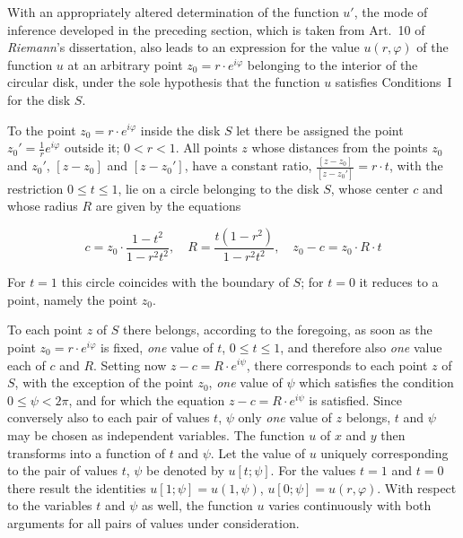 \documentclass{article}
\begin{document}
With an appropriately altered determination of the function $u'$, the mode of inference developed in the preceding section, which is taken from Art.~10 of \emph{Riemann}'s dissertation, also leads to an expression for the value $u(r, \varphi)$ of the function $u$ at an arbitrary point $z_0 = r \cdot e^{i\varphi}$ belonging to the interior of the circular disk, under the sole hypothesis that the function $u$ satisfies Conditions~I for the disk $S$.



To the point $z_0 = r \cdot e^{i\varphi}$ inside the disk $S$ let there be assigned the point $z_0' = \frac{1}{r} e^{i\varphi}$ outside it; $0 < r < 1$. All points $z$ whose distances from the points $z_0$ and $z_0'$, $[z - z_0]$ and $[z - z_0']$, have a constant ratio, $\frac{[z - z_0]}{[z - z_0']} = r \cdot t$, with the restriction $0 \le t \le 1$, lie on a circle belonging to the disk $S$, whose center $c$ and whose radius $R$ are given by the equations

\[

c = z_0 \cdot \frac{1 - t^2}{1 - r^2 t^2}, \quad R = \frac{t(1 - r^2)}{1 - r^2 t^2}, \quad z_0 - c = z_0 \cdot R \cdot t

\]

For $t = 1$ this circle coincides with the boundary of $S$; for $t = 0$ it reduces to a point, namely the point $z_0$.




To each point $z$ of $S$ there belongs, according to the foregoing, as soon as the point $z_0 = r \cdot e^{i\varphi}$ is fixed, \emph{one} value of $t$, $0 \le t \le 1$, and therefore also \emph{one} value each of $c$ and $R$. Setting now $z - c = R \cdot e^{i\psi}$, there corresponds to each point $z$ of $S$, with the exception of the point $z_0$, \emph{one} value of $\psi$ which satisfies the condition $0 \le \psi < 2\pi$, and for which the equation $z - c = R \cdot e^{i\psi}$ is satisfied. Since conversely also to each pair of values $t$, $\psi$ only \emph{one} value of $z$ belongs, $t$ and $\psi$ may be chosen as independent variables. The function $u$ of $x$ and $y$ then transforms into a function of $t$ and $\psi$. Let the value of $u$ uniquely corresponding to the pair of values $t$, $\psi$ be denoted by $u[t; \psi]$. For the values $t = 1$ and $t = 0$ there result the identities $u[1; \psi] = u(1, \psi)$, $u[0; \psi] = u(r, \varphi)$. With respect to the variables $t$ and $\psi$ as well, the function $u$ varies continuously with both arguments for all pairs of values under consideration.
\end{document}
